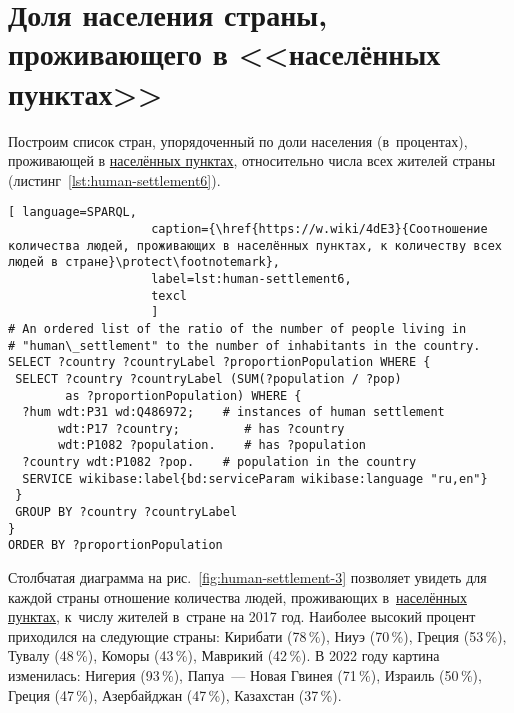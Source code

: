 \section{Доля населения страны, проживающего в <<населённых пунктах>>}

Построим список стран, 
упорядоченный по доли населения (в~процентах), проживающей в \href{http://www.wikidata.org/entity/Q486972}{населённых пунктах}, относительно числа всех жителей страны (листинг~\ref{lst:human-settlement6}).


\begin{lstlisting}[ language=SPARQL, 
                    caption={\href{https://w.wiki/4dE3}{Соотношение количества людей, проживающих в населённых пунктах, к количеству всех людей в стране}\protect\footnotemark},
                    label=lst:human-settlement6,
                    texcl 
                    ]
# An ordered list of the ratio of the number of people living in 
# "human\_settlement" to the number of inhabitants in the country.
SELECT ?country ?countryLabel ?proportionPopulation WHERE {
 SELECT ?country ?countryLabel (SUM(?population / ?pop) 
        as ?proportionPopulation) WHERE {
  ?hum wdt:P31 wd:Q486972;    # instances of human settlement  
       wdt:P17 ?country;         # has ?country 
       wdt:P1082 ?population.    # has ?population
  ?country wdt:P1082 ?pop.    # population in the country
  SERVICE wikibase:label{bd:serviceParam wikibase:language "ru,en"}
 }
 GROUP BY ?country ?countryLabel
}
ORDER BY ?proportionPopulation
\end{lstlisting}%


Столбчатая диаграмма на рис.~\ref{fig:human-settlement-3} позволяет увидеть для каждой страны 
отношение количества людей, 
проживающих в~\href{http://www.wikidata.org/entity/Q486972}{населённых пунктах}, 
к~числу жителей в~стране на 2017 год.
Наиболее высокий процент приходился на следующие страны: 
Кирибати (78\,\%), Ниуэ (70\,\%), Греция (53\,\%), Тувалу (48\,\%), Коморы (43\,\%), Маврикий (42\,\%). 
В 2022 году картина изменилась: Нигерия (93\,\%), Папуа~--- Новая Гвинея (71\,\%), 
Израиль (50\,\%), Греция (47\,\%), Азербайджан (47\,\%), Казахстан (37\,\%). 



